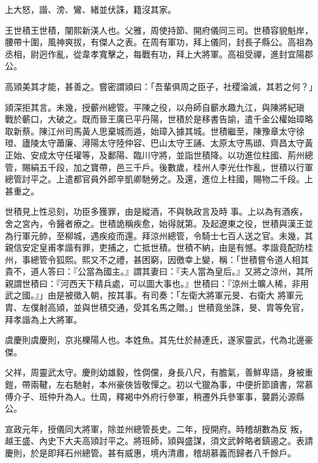 \begin{pinyinscope}
 上大怒，諧、滂、鸞、緒並伏誅，籍沒其家。



 王世積王世積，闡熙新渼人也。父雅，周使持節、開府儀同三司。世積容貌魁岸，腰帶十圍，風神爽拔，有傑人之表。在周有軍功，拜上儀同，封長子縣公。高祖為丞相，尉迥作亂，從韋孝寬擊之，每戰有功，拜上大將軍。高祖受禪，進封宜陽郡公。



 高熲美其才能，甚善之。嘗密謂熲曰：「吾輩俱周之臣子，社稷淪滅，其若之何？」



 熲深拒其言。未幾，授蘄州總管。平陳之役，以舟師自蘄水趣九江，與陳將紀瑱
 戰於蘄口，大破之。既而晉王廣已平丹陽，世積於是移書告諭，遣千金公權始璋略取新蔡。陳江州司馬黃人思棄城而遁，始璋入據其城。世積繼至，陳豫章太守徐璒、廬陵太守蕭廉、潯陽太守陸仲容、巴山太守王誦、太原太守馬頲、齊昌太守黃正始、安成太守任瓘等，及鄱陽、臨川守將，並詣世積降。以功進位柱國、荊州總管，賜絹五千段，加之寶帶，邑三千戶。後數歲，桂州人李光仕作亂，世積以行軍總管討平之。上遣都官員外郎辛凱卿馳勞之。及還，進位上柱國，賜物二千段。上甚重之。



 世積見上性忌刻，功臣多獲罪，由是縱酒，不與執政言及時
 事。上以為有酒疾，舍之宮內，令醫者療之。世積詭稱疾愈，始得就第。及起遼東之役，世積與漢王並為行軍元帥，至柳城，遇疾疫而還。拜涼州總管，令騎士七百人送之官。未幾，其親信安定皇甫孝諧有罪，吏捕之，亡抵世積。世積不納，由是有憾。孝諧竟配防桂州，事總管令狐熙。熙又不之禮，甚困窮，因徼幸上變，稱：「世積嘗令道人相其貴不，道人答曰：『公當為國主。』謂其妻曰：『夫人當為皇后。』又將之涼州，其所親謂世積曰：『河西天下精兵處，可以圖大事也。』世積曰：『涼州土曠人稀，非用武之國。』」由是被徵入朝，按其事。有司奏：「左衛大將軍元旻、右衛大
 將軍元胄、左僕射高熲，並與世積交通，受其名馬之贈。」世積竟坐誅，旻、胄等免官，拜孝諧為上大將軍。



 虞慶則虞慶則，京兆櫟陽人也。本姓魚。其先仕於赫連氏，遂家靈武，代為北邊豪傑。



 父祥，周靈武太守。慶則幼雄毅，性倜儻，身長八尺，有膽氣，善鮮卑語，身被重鎧，帶兩鞬，左右馳射，本州豪俠皆敬憚之。初以弋獵為事，中便折節讀書，常慕傅介子、班仲升為人。仕周，釋褐中外府行參軍，稍遷外兵參軍事，襲爵沁源縣公。



 宣政元年，授儀同大將軍，除並州總管長史。二年，授開府。時稽胡數為反
 叛，越王盛、內史下大夫高熲討平之。將班師，熲與盛謀，須文武幹略者鎮遏之。表請慶則，於是即拜石州總管。甚有威惠，境內清肅，稽胡慕義而歸者八千餘戶。




\end{pinyinscope}
